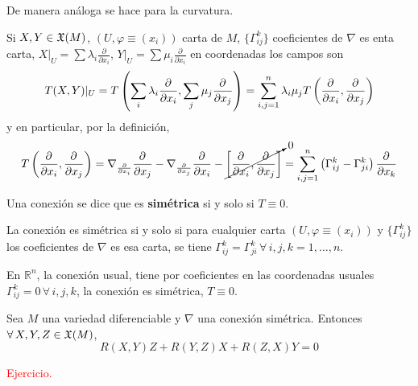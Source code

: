 De manera an\'aloga se hace para la curvatura.
\begin{ejem}
    Si $X,Y \in \mathfrak{X}(M)$, $(U, \varphi\equiv(x_i))$ carta de $M$, $\{\Gamma_{ij}^k\}$ coeficientes de $\nabla$ es enta carta, $X|_U=\sum \lambda_i \frac{\partial}{\partial x_i}$,  $Y|_U=\sum \mu_i \frac{\partial}{\partial x_i}$ en coordenadas los campos son
    $$T(X,Y)|_U = T\left(\sum_i \lambda_i \dfrac{\partial^{} }{\partial x_i} , \sum_j \mu_j \dfrac{\partial^{} }{\partial x_j} \right) = \sum_{i,j=1}^n \lambda_i \mu_j T \left(\dfrac{\partial^{} }{\partial x_i}, \dfrac{\partial^{} }{\partial x_j}\right)$$
    y en particular, por la definici\'on, 
    $$T \left(\dfrac{\partial^{} }{\partial x_i}, \dfrac{\partial^{} }{\partial x_j}\right) = \nabla_{\frac{\partial}{\partial x_i}} \dfrac{\partial^{} }{\partial x_j} -\nabla_{\frac{\partial}{\partial x_j}} \dfrac{\partial^{} }{\partial x_i} -\cancelto{0}{\left[ \dfrac{\partial^{} }{\partial x_i}, \dfrac{\partial^{} }{\partial x_j} \right]} = \sum_{i,j=1}^n \left( \Gamma_{ij}^k - \Gamma_{ji}^k\right) \dfrac{\partial^{} }{\partial x_k}$$
\end{ejem}
\begin{defi}
    Una conexi\'on se dice que es \textbf{sim\'etrica} si y solo si $T\equiv 0$.
\end{defi}
\begin{prop}
    La conexi\'on es sim\'etrica si y solo si para cualquier carta $(U,\varphi \equiv (x_i))$ y $\{\Gamma_{ij}^k\}$ los coeficientes de $\nabla$ es esa carta, se tiene $\Gamma_{ij}^k = \Gamma_{ji}^k \, \forall \, i,j,k = 1, \ldots, n$. 
\end{prop}
\begin{ejem}
    En $\mathbb R^n$, la conexi\'on usual, tiene por coeficientes en las coordenadas usuales $\Gamma_{ij}^k=0 \, \forall \, i,j,k$, la conexi\'on es sim\'etrica, $T \equiv 0 $. 
\end{ejem}
\begin{teo}
    Sea $M$ una variedad diferenciable y $\nabla$ una conexi\'on sim\'etrica. Entonces $\forall \, X, Y, Z\in \mathfrak{X}(M)$,
    $$R(X,Y)Z + R(Y,Z)X + R(Z,X)Y=0$$
\end{teo}
\begin{dem}
    \textcolor{red}{Ejercicio.}
\end{dem}
\vfill